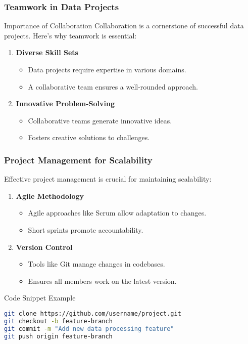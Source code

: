\documentclass[aspectratio=169]{beamer}
\begin{document}
\begin{frame}[fragile]
    \frametitle{Teamwork in Data Projects}
    \begin{block}{Importance of Collaboration}
        Collaboration is a cornerstone of successful data projects. Here’s why teamwork is essential:
    \end{block}
    \begin{enumerate}
        \item \textbf{Diverse Skill Sets}
        \begin{itemize}
            \item Data projects require expertise in various domains.
            \item A collaborative team ensures a well-rounded approach.
        \end{itemize}

        \item \textbf{Innovative Problem-Solving}
        \begin{itemize}
            \item Collaborative teams generate innovative ideas.
            \item Fosters creative solutions to challenges.
        \end{itemize}
    \end{enumerate}
\end{frame}

\begin{frame}[fragile]
    \frametitle{Project Management for Scalability}
    Effective project management is crucial for maintaining scalability:
    \begin{enumerate}
        \item \textbf{Agile Methodology}
        \begin{itemize}
            \item Agile approaches like Scrum allow adaptation to changes.
            \item Short sprints promote accountability.
        \end{itemize}

        \item \textbf{Version Control}
        \begin{itemize}
            \item Tools like Git manage changes in codebases.
            \item Ensures all members work on the latest version.
        \end{itemize}
    \end{enumerate}
    \begin{block}{Code Snippet Example}
        \begin{lstlisting}[language=bash]
git clone https://github.com/username/project.git
git checkout -b feature-branch
git commit -m "Add new data processing feature"
git push origin feature-branch
        \end{lstlisting}
    \end{block}
\end{frame}
\end{document}
